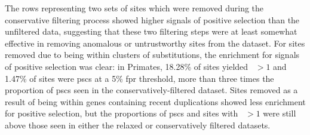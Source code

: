 The rows representing two sets of sites which were removed during the
conservative filtering process showed higher signals of positive
selection than the unfiltered data, suggesting that these two
filtering steps were at least somewhat effective in removing anomalous
or untrustworthy sites from the dataset. For sites removed due to
being within clusters of \nsyn substitutions, the enrichment for
signals of positive selection was clear: in Primates, 18.28\% of sites
yielded \omgml~$>1$ and 1.47\% of sites were \acp{psc} at a 5\%
\ac{fpr} threshold, more than three times the proportion of \acp{psc}
seen in the conservatively-filtered dataset. Sites removed as a result
of being within genes containing recent duplications showed less
enrichment for positive selection, but the proportions of \acp{psc}
and sites with \omgml~$>1$ were still above those seen in either the
relaxed or conservatively filtered datasets.

